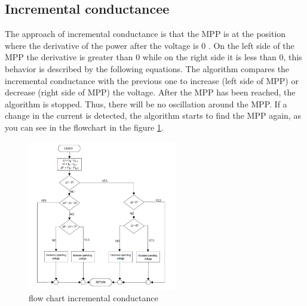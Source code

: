 \subsection{Incremental conductancee}
The approach of incremental conductance is that the MPP is at the position where the derivative of the power after the voltage is 0 . On the left side of the MPP the derivative is greater than 0 while on the right side it is less than 0, this behavior is described by the following equations.\newline
The algorithm compares the incremental conductance with the previous one to increase (left side of MPP) or decrease (right side of MPP) the voltage. After the MPP has been reached, the algorithm is stopped. Thus, there will be no oscillation around the MPP. If a change in the current is detected, the algorithm starts to find the MPP again, as you can see in the flowchart in the figure \ref{fcinccon}\cite{}.
\begin{figure}[H]
	\begin{center}
		\includegraphics[width=0.58\textwidth]{../Pictures/P1/Flow_chart/flow_chart_incremental_conductance}
		\caption{flow chart incremental conductance }
		\label{fcinccon}
	\end{center}	
\end{figure}

